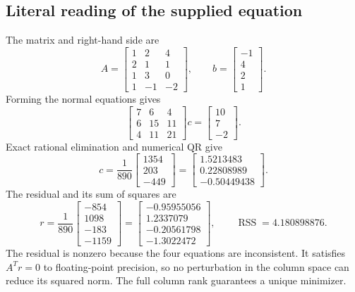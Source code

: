 \documentclass[11pt,a4paper]{article}
\newcommand{\RSS}{\operatorname{RSS}}
\begin{document}
\subsection{Literal reading of the supplied equation}
The matrix and right-hand side are
\[
A=\begin{bmatrix}1&2&4\\2&1&1\\1&3&0\\1&-1&-2\end{bmatrix},
\qquad b=\begin{bmatrix}-1\\4\\2\\1\end{bmatrix}.
\]
Forming the normal equations gives
\[
\begin{bmatrix}7 & 6 & 4\\6 & 15 & 11\\4 & 11 & 21\end{bmatrix}c=\begin{bmatrix}10\\7\\-2\end{bmatrix}.
\]
Exact rational elimination and numerical QR give
\[
c=\frac1{890}\begin{bmatrix}1354\\203\\-449\end{bmatrix}
=\begin{bmatrix}1.5213483\\0.22808989\\-0.50449438\end{bmatrix}.
\]
The residual and its sum of squares are
\[
r=\frac1{890}\begin{bmatrix}-854\\1098\\-183\\-1159\end{bmatrix}
=\begin{bmatrix}-0.95955056\\1.2337079\\-0.20561798\\-1.3022472\end{bmatrix},
\qquad \RSS=4.180898876.
\]
The residual is nonzero because the four equations are inconsistent. It satisfies $A^Tr=0$ to floating-point precision, so no perturbation in the column space can reduce its squared norm. The full column rank guarantees a unique minimizer.
\end{document}
